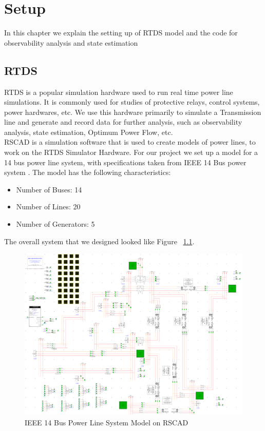 \chapter{Setup}
In this chapter we explain the setting up of RTDS model and the code for observability analysis and state estimation


\section{RTDS}
RTDS \cite{rtds} is a popular simulation hardware used to run real time power line simulations. It is commonly  used for studies of protective relays, control systems, power hardwares, etc. We use this hardware primarily to simulate a Transmission line and generate and record data for further analysis, such as observability analysis, state estimation, Optimum Power Flow, etc.\\
RSCAD is a simulation software that is used to create models of power lines, to work on the RTDS Simulator Hardware. For our project we set up a model for a 14 bus power line system, with specifications taken from IEEE 14 Bus power system \cite{IEEE14bus}. The model has the following characteristics:
\begin{itemize}
\item Number of Buses: 14
\item Number of Lines: 20
\item Number of Generators: 5
\end {itemize}
The overall system that we designed looked like Figure ~\ref{fig:ckt}.\\
\begin{figure}[h]
\includegraphics[width=\textwidth]{Figures/ckt.png}
\caption{IEEE 14 Bus Power Line System Model on RSCAD}\label{fig:ckt}
\end{figure}

